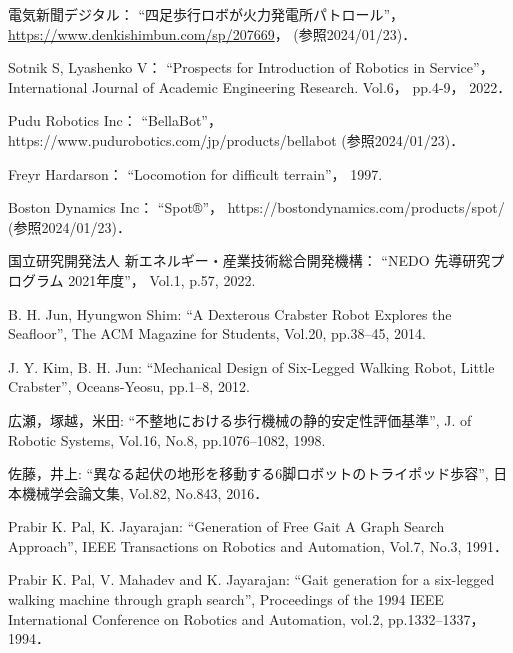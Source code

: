 ﻿

\begin{thebibliography}{99}
    
    電気新聞デジタル：
    ``四足歩行ロボが火力発電所パトロール''，
    \url{https://www.denkishimbun.com/sp/207669}，
    (参照2024/01/23)．

    Sotnik S, Lyashenko V：
    ``Prospects for Introduction of Robotics in Service''，
    International Journal of Academic Engineering Research.
    Vol.6，
    pp.4-9， %
    2022．

    Pudu Robotics Inc：
    ``BellaBot''，
    https://www.pudurobotics.com/jp/products/bellabot (参照2024/01/23)．

    Freyr Hardarson：
    ``Locomotion for difficult terrain''，
    1997.

    Boston Dynamics Inc：
    ``Spot®''，
    https://bostondynamics.com/products/spot/ (参照2024/01/23)．

    国立研究開発法人 新エネルギー・産業技術総合開発機構：
    ``NEDO 先導研究プログラム 2021年度''，
    Vol.1,
    p.57, 
    2022. 

    B. H. Jun, Hyungwon Shim:
    ``A Dexterous Crabster Robot Explores the Seafloor'',
    The ACM Magazine for Students,
    Vol.20,
    pp.38--45,
    2014.

    J. Y. Kim, B. H. Jun:
    ``Mechanical Design of Six-Legged Walking Robot, Little Crabster'',
    Oceans-Yeosu,
    pp.1--8,
    2012.

    広瀬，塚越，米田: 
    ``不整地における歩行機械の静的安定性評価基準'', 
    J. of Robotic Systems,
    Vol.16, No.8, 
    pp.1076--1082,
    1998.

    佐藤，井上:
    ``異なる起伏の地形を移動する6脚ロボットのトライポッド歩容'',
    日本機械学会論文集,
    Vol.82, No.843,
    2016．

    Prabir K. Pal, K. Jayarajan: 
    ``Generation of Free Gait A Graph Search Approach'',
    IEEE Transactions on Robotics and Automation,
    Vol.7, No.3,
    1991．

    Prabir K. Pal, V. Mahadev and K. Jayarajan:
    ``Gait generation for a six-legged walking machine through graph search'',
    Proceedings of the 1994 IEEE International Conference on Robotics and Automation,
    vol.2,
    pp.1332--1337，
    1994．


\end{thebibliography}
